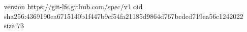 version https://git-lfs.github.com/spec/v1
oid sha256:4369190ea6715140b1f447b9cf54fa21185d9864d767bcdcd719ea56c1242022
size 73
